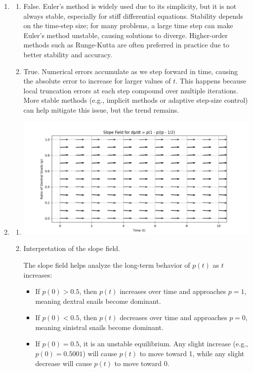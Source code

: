 \documentclass[12pt]{article}
\begin{document}
\begin{enumerate}
\item 
\begin{enumerate}
    \item False. Euler’s method is widely used due to its simplicity, but it is not always stable, especially for stiff differential equations. Stability depends on the time-step size; for many problems, a large time step can make Euler’s method unstable, causing solutions to diverge. Higher-order methods such as Runge-Kutta are often preferred in practice due to better stability and accuracy.
    
    \item True. Numerical errors accumulate as we step forward in time, causing the absolute error to increase for larger values of \( t \). This happens because local truncation errors at each step compound over multiple iterations. More stable methods (e.g., implicit methods or adaptive step-size control) can help mitigate this issue, but the trend remains.
\end{enumerate}

\item
\begin{enumerate}
    \item 
    
    \includegraphics[width=1\linewidth]{AMath301/Figure_1.png}
    \item Interpretation of the slope field.

    The slope field helps analyze the long-term behavior of \( p(t) \) as \( t \) increases:

    \begin{itemize}
        \item If \( p(0) > 0.5 \), then \( p(t) \) increases over time and approaches \( p = 1 \), meaning dextral snails become dominant.
        \item If \( p(0) < 0.5 \), then \( p(t) \) decreases over time and approaches \( p = 0 \), meaning sinistral snails become dominant.
        \item If \( p(0) = 0.5 \), it is an unstable equilibrium. Any slight increase (e.g., \( p(0) = 0.5001 \)) will cause \( p(t) \) to move toward 1, while any slight decrease will cause \( p(t) \) to move toward 0.
    \end{itemize}


\end{enumerate}
\end{enumerate}
\end{document}
